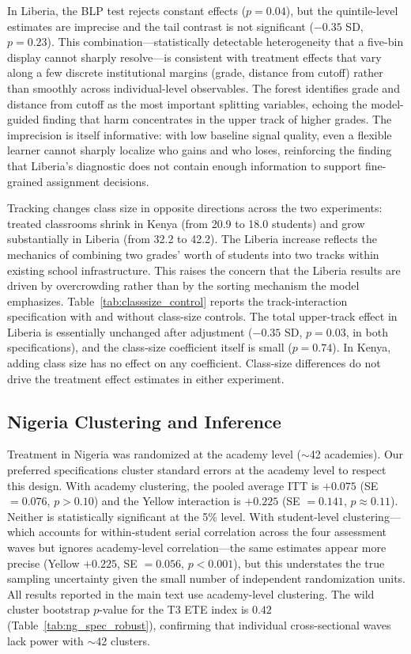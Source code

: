 \documentclass[11pt]{article}
\begin{document}
In Liberia, the BLP test rejects constant effects ($p=0.04$), but the quintile-level estimates are imprecise and the tail contrast is not significant ($-0.35$ SD, $p = 0.23$). This combination---statistically detectable heterogeneity that a five-bin display cannot sharply resolve---is consistent with treatment effects that vary along a few discrete institutional margins (grade, distance from cutoff) rather than smoothly across individual-level observables. The forest identifies grade and distance from cutoff as the most important splitting variables, echoing the model-guided finding that harm concentrates in the upper track of higher grades. The imprecision is itself informative: with low baseline signal quality, even a flexible learner cannot sharply localize who gains and who loses, reinforcing the finding that Liberia's diagnostic does not contain enough information to support fine-grained assignment decisions.

Tracking changes class size in opposite directions across the two experiments: treated classrooms shrink in Kenya (from 20.9 to 18.0 students) and grow substantially in Liberia (from 32.2 to 42.2). The Liberia increase reflects the mechanics of combining two grades' worth of students into two tracks within existing school infrastructure. This raises the concern that the Liberia results are driven by overcrowding rather than by the sorting mechanism the model emphasizes. Table~\ref{tab:classsize_control} reports the track-interaction specification with and without class-size controls. The total upper-track effect in Liberia is essentially unchanged after adjustment ($-0.35$ SD, $p = 0.03$, in both specifications), and the class-size coefficient itself is small ($p = 0.74$). In Kenya, adding class size has no effect on any coefficient. Class-size differences do not drive the treatment effect estimates in either experiment.

\subsection{Nigeria Clustering and Inference}

Treatment in Nigeria was randomized at the academy level ($\sim$42 academies). Our preferred specifications cluster standard errors at the academy level to respect this design. With academy clustering, the pooled average ITT is $+0.075$ (SE $= 0.076$, $p > 0.10$) and the Yellow interaction is $+0.225$ (SE $= 0.141$, $p \approx 0.11$). Neither is statistically significant at the 5\% level. With student-level clustering---which accounts for within-student serial correlation across the four assessment waves but ignores academy-level correlation---the same estimates appear more precise (Yellow $+0.225$, SE $= 0.056$, $p < 0.001$), but this understates the true sampling uncertainty given the small number of independent randomization units. All results reported in the main text use academy-level clustering. The wild cluster bootstrap $p$-value for the T3 ETE index is $0.42$ (Table~\ref{tab:ng_spec_robust}), confirming that individual cross-sectional waves lack power with $\sim$42 clusters.
\end{document}
